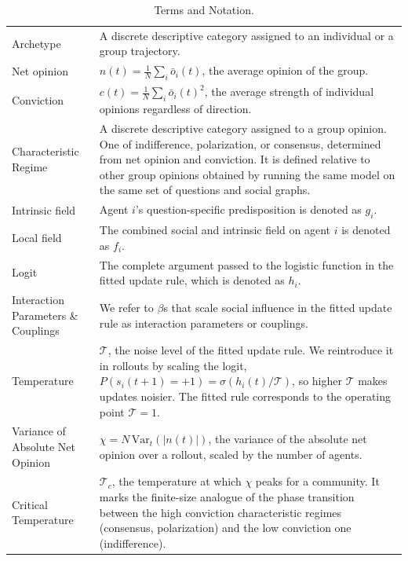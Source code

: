 \begin{table}[h!]
{\begin{tabular}{@{}lp{10cm}@{}}
\midrule 
Archetype & A discrete descriptive category assigned to an individual or a group trajectory. \\
Net opinion & $n(t) = \frac{1}{N}\sum_i \bar{o}_i(t)$, the average opinion of the group. \\
Conviction & $c(t) = \frac{1}{N}\sum_i \bar{o}_i(t)^2$, the average strength of individual opinions regardless of direction. \\
Characteristic Regime & A discrete descriptive category assigned to a group opinion. One of indifference, polarization, or consensus, determined from net opinion and conviction. It is defined relative to other group opinions obtained by running the same model on the same set of questions and social graphs. \\
\midrule 
Intrinsic field & Agent $i$'s question-specific predisposition is denoted as $g_i$. \\
Local field & The combined social and intrinsic field on agent $i$ is denoted as $f_i$. \\
Logit & The complete argument passed to the logistic function in the fitted update rule, which is denoted as $h_i$. \\
Interaction Parameters \& Couplings & We refer to $\beta$s that scale social influence in the fitted update rule as interaction parameters or couplings.\\
\midrule 
Temperature & $\mathcal{T}$, the noise level of the fitted update rule. We reintroduce it in rollouts by scaling the logit, $P(s_i(t{+}1)=+1) = \sigma(h_i(t)/\mathcal{T})$, so higher $\mathcal{T}$ makes updates noisier. The fitted rule corresponds to the operating point $\mathcal{T}=1$. \\
Variance of Absolute Net Opinion & $\chi = N\,\mathrm{Var}_t(|n(t)|)$, the variance of the absolute net opinion over a rollout, scaled by the number of agents. \\
Critical Temperature & $\mathcal{T}_c$, the temperature at which $\chi$ peaks for a community. It marks the finite-size analogue of the phase transition between the high conviction characteristic regimes (consensus, polarization) and the low conviction one (indifference). \\
\bottomrule
\end{tabular}
}
\caption{Terms and Notation.}
\label{tab:glossary}
\end{table}
